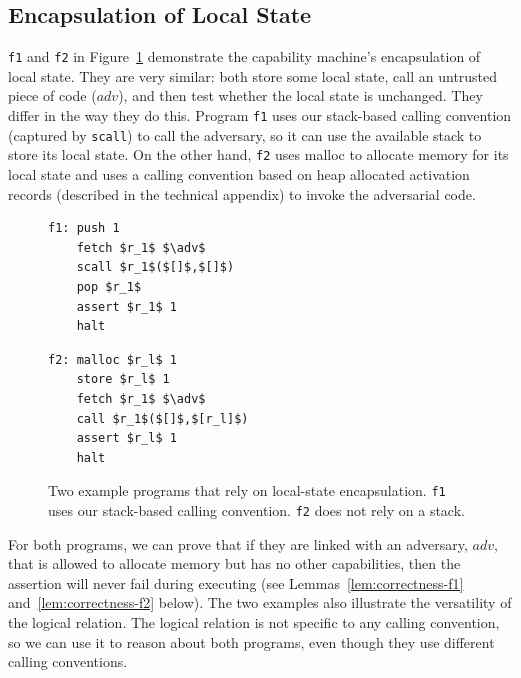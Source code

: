 \documentclass[format=acmsmall, review=true, screen=true]{acmart}
\renewcommand{\figurename}{Figure}
\newcommand\lau[1]{{\color{purple} \sf \footnotesize {LS: #1}}\\}
\newcommand\lars[1]{{\color{purple} \sf \footnotesize {LB: #1}}\\}
\renewcommand\lau[1]{}
\renewcommand\lars[1]{}
\newcommand{\var}[1]{\mathit{#1}}
\newcommand{\adv}{\var{adv}}
\begin{document}
\subsection{Encapsulation of Local State}
\texttt{f1} and \texttt{f2} in
\figurename~\ref{fig:prog-f1-and-f2} demonstrate the capability
machine's encapsulation of local state. They are very similar: both
store some local state, call an untrusted piece of code ($\adv$), and
then test whether the local state is unchanged. They differ in the way
they do this. Program \texttt{f1} uses our stack-based
calling convention (captured by \texttt{scall}) to call
the adversary, so it can use the available stack to store its local
state.  On the other hand, \texttt{f2} uses malloc to
allocate memory for its local state and uses a calling convention based on heap
allocated activation records (described in the technical appendix) to invoke
the adversarial code.

\begin{figure}[t]
  \centering

  \begin{minipage}[t]{4.1cm}
  \begin{lstlisting}
f1: push 1
    fetch $r_1$ $\adv$
    scall $r_1$($[]$,$[]$)
    pop $r_1$
    assert $r_1$ 1
    halt
  \end{lstlisting}
  \end{minipage}
  \begin{minipage}[t]{4.1cm}
  \begin{lstlisting}
f2: malloc $r_l$ 1
    store $r_l$ 1
    fetch $r_1$ $\adv$
    call $r_1$($[]$,$[r_l]$)
    assert $r_l$ 1
    halt
  \end{lstlisting}
  \end{minipage}
  \caption{Two example programs that rely on local-state encapsulation. \texttt{f1} uses our stack-based calling convention. \texttt{f2} does not rely on a stack.}
  \label{fig:prog-f1-and-f2}
\end{figure}

For both programs, we can prove that if they are linked with an adversary,
$\adv$, that is allowed to allocate memory but has no other capabilities, then
the assertion will never fail during executing (see
Lemmas~\ref{lem:correctness-f1} and~\ref{lem:correctness-f2} below).
The two examples also illustrate the versatility of the logical relation.
The logical relation is not specific to any calling convention, so we can use it to reason
about both programs, even though they use different calling conventions.
\end{document}
